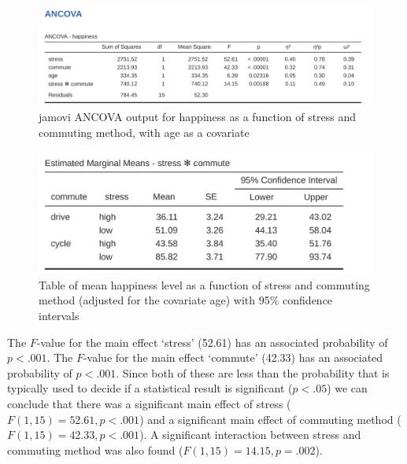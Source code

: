\documentclass[
  a4paper,
]{book}
\begin{document}
\begin{figure}

\includegraphics[width=1\textwidth,height=\textheight]{images/fig14-13.png} \hfill{}

\caption{\label{fig-fig14-13}jamovi ANCOVA output for happiness as a
function of stress and commuting method, with age as a covariate}

\end{figure}

\begin{figure}

\includegraphics[width=1\textwidth,height=\textheight]{images/fig14-14.png} \hfill{}

\caption{\label{fig-fig14-14}Table of mean happiness level as a function
of stress and commuting method (adjusted for the covariate age) with
95\% confidence intervals}

\end{figure}

The \(F\)-value for the main effect `stress' (52.61) has an associated
probability of \(p < .001\). The \(F\)-value for the main effect
`commute' (42.33) has an associated probability of \(p < .001\). Since
both of these are less than the probability that is typically used to
decide if a statistical result is significant (\(p < .05\)) we can
conclude that there was a significant main effect of stress
(\(F(1, 15) = 52.61, p < .001\)) and a significant main effect of
commuting method (\(F(1, 15) = 42.33, p < .001\)). A significant
interaction between stress and commuting method was also found
(\(F(1, 15) = 14.15, p = .002\)).
\end{document}
